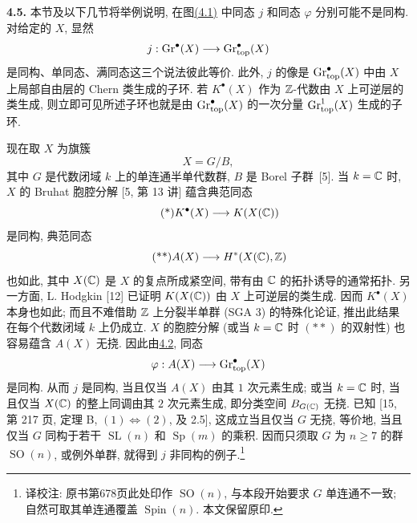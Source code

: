 \noindent{}\textbf{4.5.}
本节及以下几节将举例说明, 在图\hyperlink{sga6.e14.eq.4-1}{(4.1)} 中同态 $j$ 和同态 $\varphi$ 分别可能不是同构. 对给定的 $X$, 显然
\[
 j:\operatorname{Gr}^\bullet(X)\longrightarrow\operatorname{Gr}_{\mathrm{top}}^\bullet(X)
\]
是同构、单同态、满同态这三个说法彼此等价. 此外, $j$ 的像是 $\operatorname{Gr}_{\mathrm{top}}^\bullet(X)$ 中由 $X$ 上局部自由层的 Chern 类生成的子环. 若 $K^\bullet(X)$ 作为 $\mathbb Z$-代数由 $X$ 上可逆层的类生成, 则立即可见所述子环也就是由 $\operatorname{Gr}_{\mathrm{top}}^\bullet(X)$ 的一次分量 $\operatorname{Gr}_{\mathrm{top}}^1(X)$ 生成的子环.

现在取 $X$ 为旗簇
\[
 X=G/B,
\]
其中 $G$ 是代数闭域 $k$ 上的单连通半单代数群, $B$ 是 Borel 子群~[5]. 当 $k=\mathbb C$ 时, $X$ 的 Bruhat 胞腔分解 [5, 第 13 讲] 蕴含典范同态
\begin{equation*}\tag{*}
 K^\bullet(X)\longrightarrow K(X(\mathbb C))
\end{equation*}
是同构, 典范同态
\begin{equation*}\tag{**}
 A(X)\longrightarrow H^*(X(\mathbb C),\mathbb Z)
\end{equation*}
也如此, 其中 $X(\mathbb C)$ 是 $X$ 的复点所成紧空间, 带有由 $\mathbb C$ 的拓扑诱导的通常拓扑. 另一方面, L. Hodgkin [12] 已证明 $K(X(\mathbb C))$ 由 $X$ 上可逆层的类生成. 因而 $K^\bullet(X)$ 本身也如此; 而且不难借助 $\mathbb Z$ 上分裂半单群 (SGA 3) 的特殊化论证, 推出此结果在每个代数闭域 $k$ 上仍成立. $X$ 的胞腔分解 (或当 $k=\mathbb C$ 时 $(**)$ 的双射性) 也容易蕴含 $A(X)$ 无挠. 因此由\hyperlink{sga6.e14.para.4-2}{4.2}, 同态
\[
 \varphi:A(X)\longrightarrow\operatorname{Gr}_{\mathrm{top}}^\bullet(X)
\]
是同构. 从而 $j$ 是同构, 当且仅当 $A(X)$ 由其 $1$ 次元素生成; 或当 $k=\mathbb C$ 时, 当且仅当 $X(\mathbb C)$ 的整上同调由其 $2$ 次元素生成, 即分类空间 $B_{G(\mathbb C)}$ 无挠. 已知 [15, 第 217 页, 定理 B, $(1)\Leftrightarrow(2)$, 及 2.5], 这成立当且仅当 $G$ 无挠, 等价地, 当且仅当 $G$ 同构于若干 $\operatorname{SL}(n)$ 和 $\operatorname{Sp}(m)$ 的乘积. 因而只须取 $G$ 为 $n\geq7$ 的群 $\operatorname{SO}(n)$, 或例外单群, 就得到 $j$ 非同构的例子.\footnote{译校注: 原书第678页此处印作 $\operatorname{SO}(n)$, 与本段开始要求 $G$ 单连通不一致; 自然可取其单连通覆盖 $\operatorname{Spin}(n)$. 本文保留原印.}

